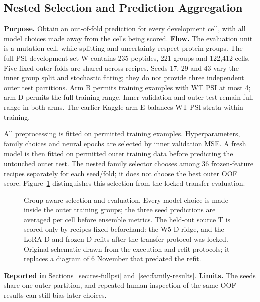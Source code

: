\subsection{Nested Selection and Prediction Aggregation}
\textbf{Purpose.} Obtain an out-of-fold prediction for every development cell, with all model choices made away from the cells being scored.
\textbf{Flow.}
The evaluation unit is a mutation cell, while splitting and uncertainty respect protein groups.
The full-PSI development set W contains 235 peptides, 221 groups and 122,412 cells. Five fixed outer
folds are shared across recipes. Seeds 17, 29 and 43 vary the inner group split and stochastic fitting;
they do not provide three independent outer test partitions. Arm B permits training examples with
WT PSI at most 4; arm D permits the full training range. Inner validation and outer test remain
full-range in both arms. The earlier Kaggle arm E balances WT-PSI strata within training.

All preprocessing is fitted on permitted training examples. Hyperparameters, family choices and
neural epochs are selected by inner validation MSE. A fresh model is then fitted on permitted outer
training data before predicting the untouched outer test. The nested family selector chooses among
36 frozen-feature recipes separately for each seed/fold; it does not choose the best outer OOF score.
Figure~\ref{fig:campaign-nested} distinguishes this selection from the locked transfer evaluation.

\begin{figure}[htbp]
  \centering
  
  \caption[Group-aware selection and evaluation]{Group-aware selection and evaluation. Every model choice is made inside the outer
  training groups; the three seed predictions are averaged per cell before ensemble metrics. The
  held-out source T is scored only by recipes fixed beforehand: the W5-D ridge, and the LoRA-D and
  frozen-D refits after the transfer protocol was locked. Original schematic drawn from the
  execution and refit protocols; it replaces a diagram of 6 November that predated the refit.}
  \label{fig:campaign-nested}
\end{figure}

\textbf{Reported in} Sections~\ref{sec:res-fullpsi} and~\ref{sec:family-results}. \textbf{Limits.} The
seeds share one outer partition, and repeated human inspection of the same OOF results can still bias
later choices.

